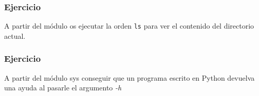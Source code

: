 \documentclass{beamer}
\begin{document}
\begin{frame}
  \frametitle{Ejercicio}
  A partir del módulo os ejecutar la orden \texttt{ls} para ver el
  contenido del directorio actual.
\end{frame}

\begin{frame}
  \frametitle{Ejercicio}
  A partir del módulo sys conseguir que un programa escrito en Python
  devuelva una ayuda al pasarle el argumento \emph{-h}
\end{frame}








\end{document}
